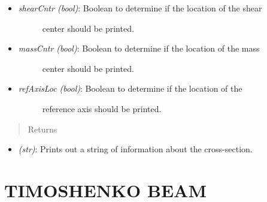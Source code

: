 \documentclass[letterpaper,10pt,english]{sphinxmanual}
\begin{document}
\begin{fulllineitems}
\begin{fulllineitems}
\begin{itemize}
\begin{description}
\end{description}

\item {} \begin{description}
\item[{\emph{shearCntr (bool)}: Boolean to determine if the location of the shear}] \leavevmode
center should be printed.

\end{description}

\item {} \begin{description}
\item[{\emph{massCntr (bool)}: Boolean to determine if the location of the mass}] \leavevmode
center should be printed.

\end{description}

\item {} \begin{description}
\item[{\emph{refAxisLoc (bool)}: Boolean to determine if the location of the}] \leavevmode
reference axis should be printed.

\end{description}

\end{itemize}
\begin{quote}\begin{description}
\item[{Returns}] \leavevmode
\end{description}\end{quote}
\begin{itemize}
\item {} 
\emph{(str)}: Prints out a string of information about the cross-section.

\end{itemize}

\end{fulllineitems}


\end{fulllineitems}



\section{TIMOSHENKO BEAM}
\label{structures:timoshenko-beam}
\end{document}
